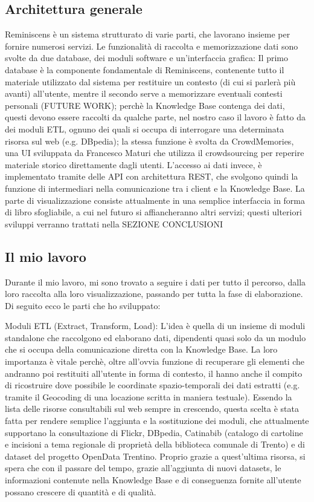 \documentclass[sigproc-sp.tex]{subfiles}
\begin{document}
\subsection{Architettura generale}
Reminiscens è un sistema strutturato di varie parti, che lavorano insieme per fornire numerosi servizi. Le funzionalità di raccolta e memorizzazione dati sono svolte da due database, dei moduli software e un’interfaccia grafica: Il primo database è la componente fondamentale di Reminiscens, contenente tutto il materiale utilizzato dal sistema per restituire un contesto (di cui si parlerà più avanti) all’utente, mentre il secondo serve a memorizzare eventuali contesti personali (FUTURE WORK); perchè la Knowledge Base contenga dei dati, questi devono essere raccolti da qualche parte, nel nostro caso il lavoro è fatto da dei moduli ETL, ognuno dei quali si occupa di interrogare una determinata risorsa sul web (e.g. DBpedia); la stessa funzione è svolta da CrowdMemories, una UI sviluppata da Francesco Maturi che utilizza il crowdsourcing per reperire materiale storico direttamente dagli utenti. L’accesso ai dati invece, è implementato tramite delle API con architettura REST, che svolgono quindi la funzione di intermediari nella comunicazione tra i client e la Knowledge Base. La parte di visualizzazione consiste attualmente in una semplice interfaccia in forma di libro sfogliabile, a cui nel futuro si affiancheranno altri servizi; questi ulteriori sviluppi verranno trattati nella SEZIONE CONCLUSIONI

\subsection{Il mio lavoro}
Durante il mio lavoro, mi sono trovato a seguire i dati per tutto il percorso, dalla loro raccolta alla loro visualizzazione, passando per tutta la fase di elaborazione. Di seguito ecco le parti che ho sviluppato:

Moduli ETL (Extract, Transform, Load): L’idea è quella di un insieme di moduli standalone che raccolgono ed elaborano dati, dipendenti quasi solo da un modulo che si occupa della comunicazione diretta con la Knowledge Base. La loro importanza è vitale perchè, oltre all’ovvia funzione di recuperare gli elementi che andranno poi restituiti all’utente in forma di contesto, il hanno anche il compito di ricostruire dove possibile le coordinate spazio-temporali dei dati estratti (e.g. tramite il Geocoding di una locazione scritta in maniera testuale). Essendo la lista delle risorse consultabili sul web sempre in crescendo, questa scelta è stata fatta per rendere semplice l’aggiunta e la sostituzione dei moduli, che attualmente supportano la consultazione di Flickr, DBpedia, Catinabib (catalogo di cartoline e incisioni a tema regionale di proprietà della biblioteca comunale di Trento) e di dataset del progetto OpenData Trentino. Proprio grazie a quest’ultima risorsa, si spera che con il passare del tempo, grazie all’aggiunta di nuovi datasets, le informazioni contenute nella Knowledge Base e di conseguenza fornite all’utente possano crescere di quantità e di qualità. 
\end{document}
